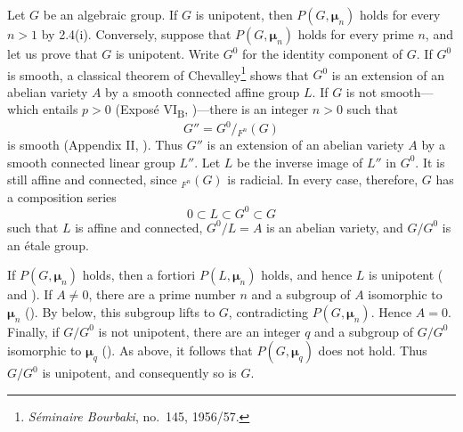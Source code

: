 Let \(G\) be an algebraic group.  If \(G\) is unipotent, then
\(P(G,\boldsymbol\mu_n)\) holds for every \(n>1\) by 2.4(i).
Conversely, suppose that \(P(G,\boldsymbol\mu_n)\) holds for every
prime \(n\), and let us prove that \(G\) is unipotent.  Write
\(G^0\) for the identity component of \(G\).  If \(G^0\) is
smooth, a classical theorem of
Chevalley\begingroup\renewcommand{\thefootnote}{*}\footnote[0]{%
\emph{Séminaire Bourbaki}, no.\ 145, 1956/57.}\endgroup
shows that \(G^0\) is an extension
of an abelian variety \(A\) by a smooth connected affine group
\(L\).  If \(G\) is not smooth---which entails \(p>0\)
(Exposé VI\textsubscript{B}, )---there is an integer \(n>0\)
such that
\[
  G''=G^0/{}_{F^n}(G)
\]
is smooth (Appendix II, ).  Thus \(G''\) is an extension of an
abelian variety \(A\) by a smooth connected linear group \(L''\).
Let \(L\) be the inverse image of \(L''\) in \(G^0\).  It is still
affine and connected, since \({}_{F^n}(G)\) is radicial.  In every
case, therefore, \(G\) has a composition series
\[
  0\subset L\subset G^0\subset G
\]
such that \(L\) is affine and connected, \(G^0/L=A\) is an
abelian variety, and \(G/G^0\) is an étale group.

If \(P(G,\boldsymbol\mu_n)\) holds, then a fortiori
\(P(L,\boldsymbol\mu_n)\) holds, and hence \(L\) is unipotent
( and ).  If \(A\ne0\), there are a prime number \(n\)
and a subgroup of \(A\) isomorphic to \(\boldsymbol\mu_n\) ().
By  below, this subgroup lifts to \(G\), contradicting
\(P(G,\boldsymbol\mu_n)\).  Hence \(A=0\).  Finally, if
\(G/G^0\) is not unipotent, there are an integer \(q\) and a
subgroup of \(G/G^0\) isomorphic to \(\boldsymbol\mu_q\) ().
As above, it follows that \(P(G,\boldsymbol\mu_q)\) does not hold.
Thus \(G/G^0\) is unipotent, and consequently so is \(G\).



